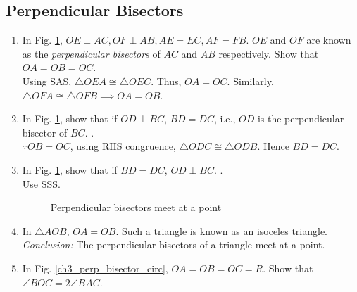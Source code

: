 \subsection{Perpendicular Bisectors}
\renewcommand{\theequation}{\theenumi}
\begin{enumerate}[label=\arabic*.,ref=\thesubsection.\theenumi]

\item
	In Fig. \ref{ch3_perp_bisector}, $OE \perp AC, OF \perp AB, AE=EC, AF=FB$.  $OE$ and $OF$ are known as the {\em perpendicular bisectors} of $AC$ and $AB$ respectively.  Show that $OA=OB=OC$.
%
\\
\solution Using SAS, $\triangle OEA \cong \triangle OEC$.  Thus, $OA = OC$.  Similarly,   $\triangle OFA \cong \triangle OFB \implies OA = OB$.

\item
	In Fig. \ref{ch3_perp_bisector}, show that if $OD \perp BC$, $BD=DC$, i.e., $OD$ is the perpendicular bisector of $BC$.
.
\\
\solution $\because OB = OC$, using RHS congruence, $\triangle ODC \cong \triangle ODB$.  Hence $BD = DC$.\item
	In Fig. \ref{ch3_perp_bisector}, show that if $BD=DC$, $OD \perp BC$.
.
\\
\solution Use SSS.
\begin{figure}[!ht]
	\begin{center}
		
		\resizebox{\columnwidth}{!}{}
	\end{center}
	\caption{Perpendicular bisectors meet at a point}
	\label{ch3_perp_bisector}	
\end{figure}
%
%
%
\item
	In $\triangle AOB$, $OA = OB$.  Such a triangle is known as an isoceles triangle.
%
%
\\
{\em Conclusion:}  The perpendicular bisectors of a triangle meet at a point.
%
\item In Fig. \eqref{ch3_perp_bisector_circ}, $OA = OB=OC = R$.  Show that $\angle BOC = 2\angle BAC$. 			\label{ch4_prob_circle_subtend}


\end{enumerate}
